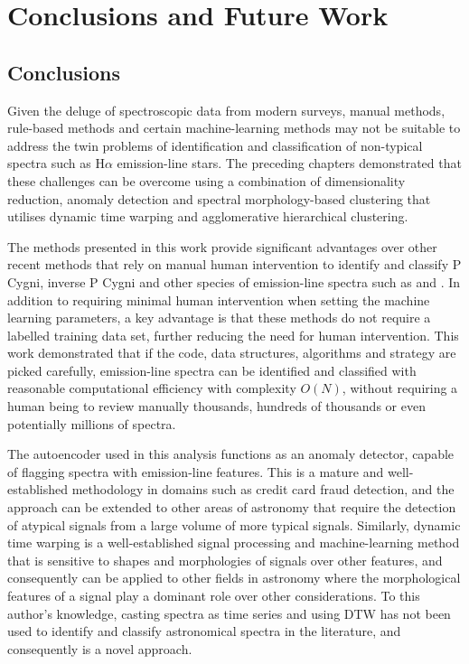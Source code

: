 \chapter{Conclusions and Future Work}

\section{Conclusions}

Given the deluge of spectroscopic data from modern surveys, manual methods, rule-based methods and certain machine-learning methods may not be suitable to address the twin problems of identification and classification of non-typical spectra such as H$\alpha$ emission-line stars. The preceding chapters demonstrated that these challenges can be overcome using a combination of dimensionality reduction, anomaly detection and spectral morphology-based clustering that utilises dynamic time warping and agglomerative hierarchical clustering. 

The methods presented in this work provide significant advantages over other recent methods that rely on manual human intervention to identify and classify P Cygni, inverse P Cygni and other species of emission-line spectra such as \citet{zhang2021catalog} and \citet{zhao2012lamost}. In addition to requiring minimal human intervention when setting the machine learning parameters, a key advantage is that these methods do not require a labelled training data set, further reducing the need for human intervention. This work demonstrated that if the code, data structures, algorithms and strategy are picked carefully, emission-line spectra can be identified and classified with reasonable computational efficiency with complexity $O(N)$, without requiring a human being to review manually thousands, hundreds of thousands  or even potentially millions of spectra.

The autoencoder used in this analysis functions as an anomaly detector, capable of flagging spectra with emission-line features. This is a mature and well-established methodology in domains such as credit card fraud detection, and the approach can be extended to other areas of astronomy that require the detection of atypical signals from a large volume of more typical signals. Similarly, dynamic time warping is a well-established signal processing and machine-learning method that is sensitive to shapes and morphologies of signals over other features, and consequently can be applied to other fields in astronomy where the morphological features of a signal play a dominant role over other considerations. To this author's knowledge, casting spectra as time series and using DTW has not been used to identify and classify astronomical spectra in the literature, and consequently is a novel approach. 

